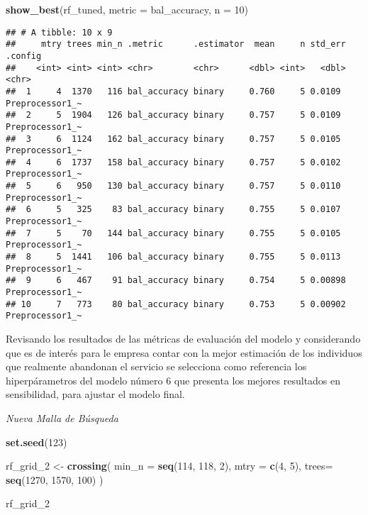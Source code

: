 \documentclass[
]{article}
\newenvironment{Shaded}{\begin{snugshade}}{\end{snugshade}}
\newcommand{\AttributeTok}[1]{\textcolor[rgb]{0.13,0.29,0.53}{#1}}
\newcommand{\DecValTok}[1]{\textcolor[rgb]{0.00,0.00,0.81}{#1}}
\newcommand{\FunctionTok}[1]{\textcolor[rgb]{0.13,0.29,0.53}{\textbf{#1}}}
\newcommand{\NormalTok}[1]{#1}
\newcommand{\OtherTok}[1]{\textcolor[rgb]{0.56,0.35,0.01}{#1}}
\newcommand{\StringTok}[1]{\textcolor[rgb]{0.31,0.60,0.02}{#1}}
\begin{document}
\begin{Shaded}
\begin{Highlighting}[]
\FunctionTok{show\_best}\NormalTok{(rf\_tuned, }\AttributeTok{metric =} \StringTok{\textquotesingle{}bal\_accuracy\textquotesingle{}}\NormalTok{, }\AttributeTok{n =} \DecValTok{10}\NormalTok{)}
\end{Highlighting}
\end{Shaded}

\begin{verbatim}
## # A tibble: 10 x 9
##     mtry trees min_n .metric      .estimator  mean     n std_err .config        
##    <int> <int> <int> <chr>        <chr>      <dbl> <int>   <dbl> <chr>          
##  1     4  1370   116 bal_accuracy binary     0.760     5 0.0109  Preprocessor1_~
##  2     5  1904   126 bal_accuracy binary     0.757     5 0.0109  Preprocessor1_~
##  3     6  1124   162 bal_accuracy binary     0.757     5 0.0105  Preprocessor1_~
##  4     6  1737   158 bal_accuracy binary     0.757     5 0.0102  Preprocessor1_~
##  5     6   950   130 bal_accuracy binary     0.757     5 0.0110  Preprocessor1_~
##  6     5   325    83 bal_accuracy binary     0.755     5 0.0107  Preprocessor1_~
##  7     5    70   144 bal_accuracy binary     0.755     5 0.0105  Preprocessor1_~
##  8     5  1441   106 bal_accuracy binary     0.755     5 0.0113  Preprocessor1_~
##  9     6   467    91 bal_accuracy binary     0.754     5 0.00898 Preprocessor1_~
## 10     7   773    80 bal_accuracy binary     0.753     5 0.00902 Preprocessor1_~
\end{verbatim}

Revisando los resultados de las métricas de evaluación del modelo y
considerando que es de interés para le empresa contar con la mejor
estimación de los individuos que realmente abandonan el servicio se
selecciona como referencia los hiperpárametros del modelo número 6 que
presenta los mejores resultados en sensibilidad, para ajustar el modelo
final.

\emph{Nueva Malla de Búsqueda}

\begin{Shaded}
\begin{Highlighting}[]
\FunctionTok{set.seed}\NormalTok{(}\DecValTok{123}\NormalTok{)}

\NormalTok{rf\_grid\_2 }\OtherTok{\textless{}{-}} \FunctionTok{crossing}\NormalTok{(}
  \AttributeTok{min\_n =} \FunctionTok{seq}\NormalTok{(}\DecValTok{114}\NormalTok{, }\DecValTok{118}\NormalTok{, }\DecValTok{2}\NormalTok{),}
  \AttributeTok{mtry =} \FunctionTok{c}\NormalTok{(}\DecValTok{4}\NormalTok{, }\DecValTok{5}\NormalTok{),}
  \AttributeTok{trees=} \FunctionTok{seq}\NormalTok{(}\DecValTok{1270}\NormalTok{, }\DecValTok{1570}\NormalTok{, }\DecValTok{100}\NormalTok{)}
\NormalTok{)}

\NormalTok{rf\_grid\_2}
\end{Highlighting}
\end{Shaded}
\end{document}
